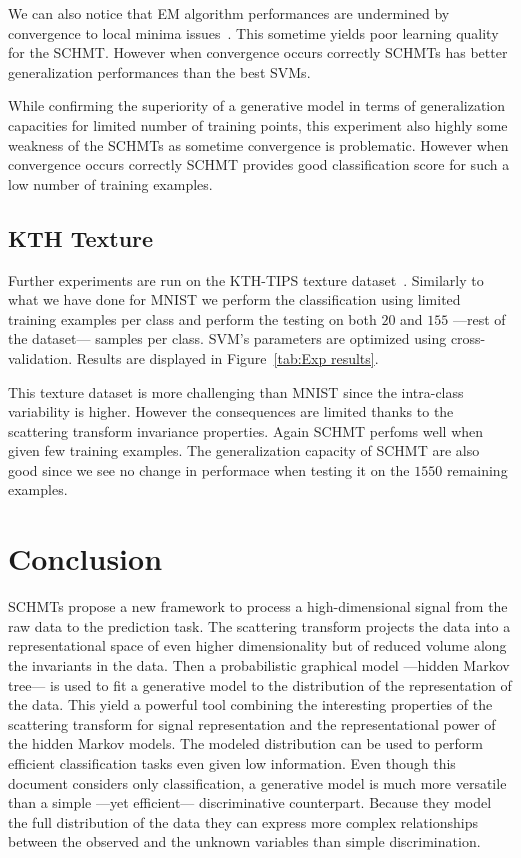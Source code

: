 \documentclass{article}
\begin{document}
		We can also notice that EM algorithm performances are undermined by convergence to local minima issues~\cite{moon1996expectation}. This sometime yields poor learning quality for the SCHMT. However when convergence occurs correctly SCHMTs has better generalization performances than the best SVMs.
		
		While confirming the superiority of a generative model in terms of generalization capacities for limited number of training points, this experiment also highly some weakness of the SCHMTs as sometime convergence is problematic. However when convergence occurs correctly SCHMT provides good classification score for such a low number of training examples.
		
	\vspace{-5pt}
	\subsection{KTH Texture}
		\label{subsec:Exps/KTH Texture}
		\vspace{-5pt}
		Further experiments are run on the KTH-TIPS texture dataset~\cite{KTH2016web}. Similarly to what we have done for MNIST we perform the classification using limited training examples per class and perform the testing on both $20$ and $155$ ---\ie rest of the dataset--- samples per class. SVM's parameters are optimized using cross-validation. Results are displayed in Figure~\ref{tab:Exp results}.
		
		This texture dataset is more challenging than MNIST since the intra-class variability is higher. However the consequences are limited thanks to the scattering transform invariance properties. Again SCHMT perfoms well when given few training examples. The generalization capacity of SCHMT are also good since we see no change in performace when testing it on the $1550$ remaining examples. 

\section{Conclusion}
  \label{sec:Conclusion}
  \vspace{-5pt}
  SCHMTs propose a new framework to process a high-dimensional signal from the raw data to the prediction task. The scattering transform projects the data into a representational space of even higher dimensionality but of reduced volume along the invariants in the data. Then a probabilistic graphical model ---hidden Markov tree--- is used to fit a generative model to the distribution of the representation of the data. This yield a powerful tool combining the interesting properties of the scattering transform for signal representation and the representational power of the hidden Markov models. The modeled distribution can be used to perform efficient classification tasks even given low information. Even though this document considers only classification, a generative model is much more versatile than a simple ---yet efficient--- discriminative counterpart. Because they model the full distribution of the data they can express more complex relationships between the observed and the unknown variables than simple discrimination. 
  
\end{document}
